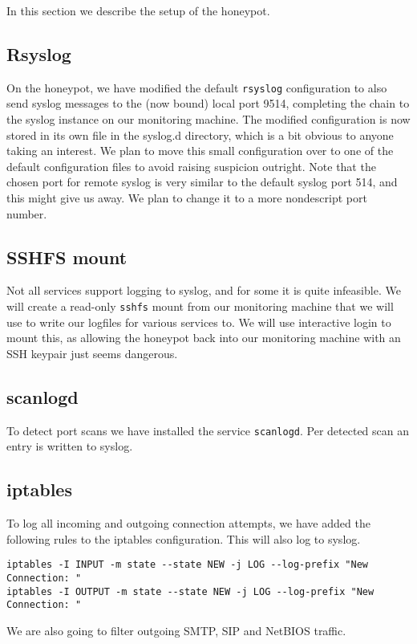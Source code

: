 \documentclass[11pt]{article}
\begin{document}
In this section we describe the setup of the honeypot.

\subsection{Rsyslog}
On the honeypot, we have modified the default \verb|rsyslog| configuration to also send syslog messages to the (now bound) local port 9514, completing the chain to the syslog instance on our monitoring machine.
The modified configuration is now stored in its own file in the syslog.d directory, which is a bit obvious to anyone taking an interest.
We plan to move this small configuration over to one of the default configuration files to avoid raising suspicion outright.
Note that the chosen port for remote syslog is very similar to the default syslog port 514, and this might give us away.
We plan to change it to a more nondescript port number.

\subsection{SSHFS mount}
Not all services support logging to syslog, and for some it is quite infeasible.
We will create a read-only \verb|sshfs| mount from our monitoring machine that we will use to write our logfiles for various services to.
We will use interactive login to mount this, as allowing the honeypot back into our monitoring machine with an SSH keypair just seems dangerous.

\subsection{scanlogd}
To detect port scans we have installed the service \verb|scanlogd|.
Per detected scan an entry is written to syslog.

\subsection{iptables}
To log all incoming and outgoing connection attempts, we have added the following rules to the iptables configuration. 
This will also log to syslog.

\begin{verbatim}
iptables -I INPUT -m state --state NEW -j LOG --log-prefix "New Connection: "
iptables -I OUTPUT -m state --state NEW -j LOG --log-prefix "New Connection: "
\end{verbatim}

We are also going to filter outgoing SMTP, SIP and NetBIOS traffic.
\end{document}
